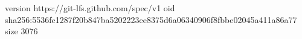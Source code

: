 version https://git-lfs.github.com/spec/v1
oid sha256:5536fc1287f20b847ba5202223ee8375d6a06340906f8fbbe02045a411a86a77
size 3076
